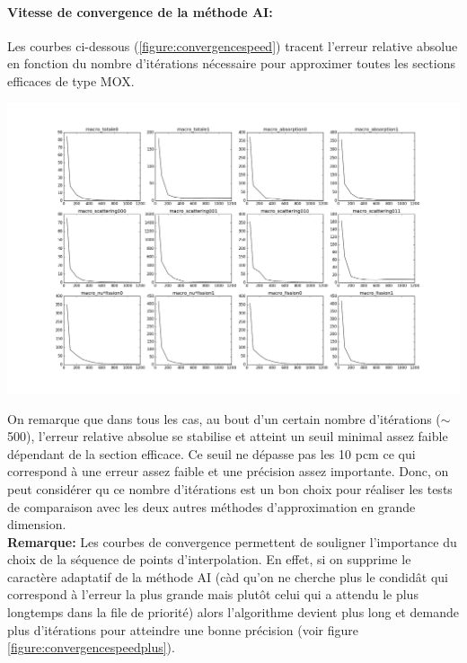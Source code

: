 \paragraph{Vitesse de convergence de la méthode AI:\\}
\hspace{0.5cm}
Les courbes ci-dessous (\ref{figure:convergencespeed}) tracent l'erreur relative absolue en fonction du nombre d'itérations nécessaire pour approximer toutes les sections efficaces de type MOX.
\begin{center}
\includegraphics[height= 9 cm,width = \linewidth]{images/MOX/Convergence_speed.png}
\label{figure:convergencespeed}
\end{center}
\hspace{0.5cm} On remarque que dans tous les cas, au bout d'un certain nombre d'itérations ($\sim$ 500), l'erreur relative absolue se stabilise et atteint un seuil minimal assez faible dépendant de la section efficace. Ce seuil ne dépasse pas les 10 pcm ce qui correspond à une erreur assez faible et une précision assez importante. Donc, on peut considérer qu ce nombre d'itérations est un bon choix pour réaliser les tests de comparaison avec les deux autres méthodes d'approximation en grande dimension. \\
\textbf{Remarque: } Les courbes de convergence permettent de souligner l'importance du choix de la séquence de points d'interpolation. En effet, si on supprime le caractère adaptatif de la méthode AI (càd qu'on ne cherche plus le condidât qui correspond à l'erreur la plus grande mais plutôt celui qui a attendu le plus longtemps dans la file de priorité) alors l'algorithme devient plus long et demande plus d'itérations pour atteindre une bonne précision (voir figure \ref{figure:convergencespeedplus}).
